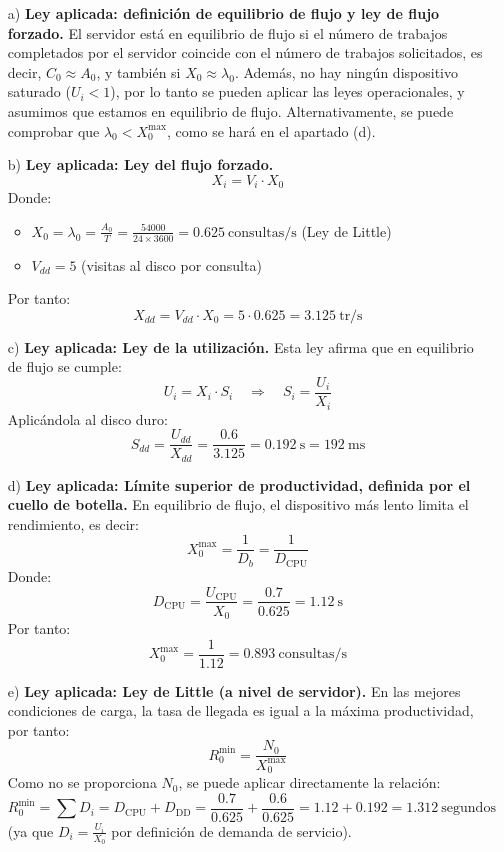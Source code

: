 \documentclass[a4paper,12pt]{article}
\begin{document}
    \begin{itemize}
        \item [a)] \textbf{Ley aplicada: definición de equilibrio de flujo y ley de flujo forzado.}  
        El servidor está en equilibrio de flujo si el número de trabajos completados por el servidor coincide con el número de trabajos solicitados, es decir, $C_0 \approx A_0$, y también si $X_0 \approx \lambda_0$.  
        Además, no hay ningún dispositivo saturado ($U_i < 1$), por lo tanto se pueden aplicar las leyes operacionales, y asumimos que estamos en equilibrio de flujo.  
        Alternativamente, se puede comprobar que $\lambda_0 < X_0^{\text{max}}$, como se hará en el apartado (d).  
        
        \item [b)] \textbf{Ley aplicada: Ley del flujo forzado.}  
        $$ X_i = V_i \cdot X_0 $$
        Donde:
        \begin{itemize}
            \item $X_0 = \lambda_0 = \frac{A_0}{T} = \frac{54000}{24 \times 3600} = 0.625\ \text{consultas/s}$  \hfill (Ley de Little)
            \item $V_{dd} = 5$ (visitas al disco por consulta)
        \end{itemize}
        Por tanto:
        $$
        X_{dd} = V_{dd} \cdot X_0 = 5 \cdot 0.625 = \boxed{3.125\ \text{tr/s}}
        $$
    
        \item [c)] \textbf{Ley aplicada: Ley de la utilización.}  
        Esta ley afirma que en equilibrio de flujo se cumple:
        $$ U_i = X_i \cdot S_i \quad \Rightarrow \quad S_i = \frac{U_i}{X_i} $$
        Aplicándola al disco duro:
        $$
        S_{dd} = \frac{U_{dd}}{X_{dd}} = \frac{0.6}{3.125} = 0.192\ \text{s} = \boxed{192\ \text{ms}}
        $$
    
        \item [d)] \textbf{Ley aplicada: Límite superior de productividad, definida por el cuello de botella.}  
        En equilibrio de flujo, el dispositivo más lento limita el rendimiento, es decir:
        $$
        X_0^{\text{max}} = \frac{1}{D_b} = \frac{1}{D_{\text{CPU}}}
        $$
        Donde:
        $$
        D_{\text{CPU}} = \frac{U_{\text{CPU}}}{X_0} = \frac{0.7}{0.625} = 1.12\ \text{s}
        $$
        Por tanto:
        $$
        X_0^{\text{max}} = \frac{1}{1.12} = \boxed{0.893\ \text{consultas/s}}
        $$
    
        \item [e)] \textbf{Ley aplicada: Ley de Little (a nivel de servidor).}  
        En las mejores condiciones de carga, la tasa de llegada es igual a la máxima productividad, por tanto:
        $$
        R_0^{\text{min}} = \frac{N_0}{X_0^{\text{max}}}
        $$
        Como no se proporciona $N_0$, se puede aplicar directamente la relación:
        $$
        R_0^{\text{min}} = \sum D_i = D_{\text{CPU}} + D_{\text{DD}} = \frac{0.7}{0.625} + \frac{0.6}{0.625} = 1.12 + 0.192 = \boxed{1.312\ \text{segundos}}
        $$
        (ya que $D_i = \frac{U_i}{X_0}$ por definición de demanda de servicio).
    \end{itemize}
\end{document}
